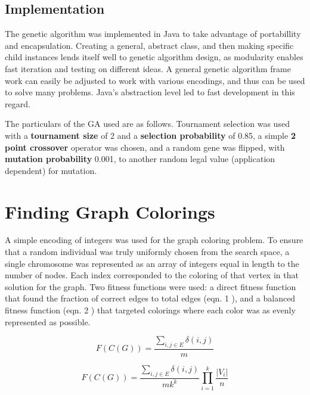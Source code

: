 \documentclass{article}
\begin{document}
	\subsection{Implementation}
	The genetic algorithm was implemented in Java to take advantage of portabillity and encapsulation. Creating a general, abstract class, and then making specific child instances lends itself well to genetic algorithm design, as modularity enables fast iteration and testing on different ideas. A general genetic algorithm frame work can easily be adjusted to work with various encodings, and thus can be used to solve many problems. Java's abstraction level led to fast development in this regard.\par

	The particulars of the GA used are as follows. Tournament selection was used with a \textbf{tournament size} of 2 and a \textbf{selection probability} of 0.85, a simple \textbf{2 point crossover} operator was chosen, and a random gene was flipped, with \textbf{mutation probability} 0.001, to another random legal value (application dependent) for mutation.\par

\section{Finding Graph Colorings}

	A simple encoding of integers was used for the graph coloring problem. To ensure that a random individual was truly uniformly chosen from the search space, a single chromosome was represented as an array of integers equal in length to the number of nodes. Each index corresponded to the coloring of that vertex in that solution for the graph. Two fitness functions were used: a direct fitness function that found the fraction of correct edges to total edges (eqn. 1 ), and a balanced fitness function (eqn. 2 ) that targeted colorings where each color was as evenly represented as possible.\par

	\begin{equation} \label{eqn:standardFitness}
	F(C(G)) = \frac{\sum_{i,j\in E}\delta(i,j)}{m}
	\end{equation}

	\begin{equation} \label{eqn:balance}
	F(C(G)) = \frac{\sum_{i,j\in E}\delta(i,j)}{m{k^k}}\prod_{i=1}^{k}\frac{|V_i|}{n}
	\end{equation}
\end{document}
